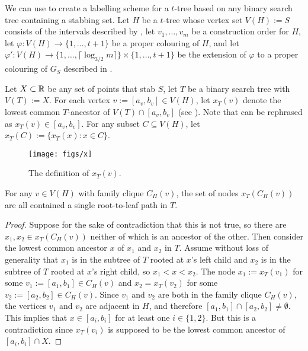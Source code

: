 \documentclass[kpfonts]{patmorin}
\begin{document}
We can use  to create a labelling scheme for a $t$-tree based on any binary search tree containing a stabbing set.  Let $H$ be a $t$-tree whose vertex set $V(H):=S$ consists of the intervals described by , let $v_1,\ldots,v_m$ be a construction order for $H$, let $\varphi:V(H)\to\{1,\ldots,t+1\}$ be a proper colouring of $H$, and let $\varphi':V(H)\to\{1,\ldots,\lceil\log_{3/2} m\rceil\}\times\{1,\ldots,t+1\}$ be the extension of $\varphi$ to a proper colouring of $G_S$ described in .

Let $X\subset\mathbb{R}$ be any set of points that stab $S$, let $T$ be a binary search tree with $V(T):=X$.
For each vertex $v:=[a_v,b_v]\in V(H)$, let $x_T(v)$ denote the lowest common $T$-ancestor of $V(T)\cap [a_v,b_v]$ (see ).  Note that  can be rephrased as $x_T(v)\in [a_v,b_v]$. For any subset $C\subseteq V(H)$, let $x_T(C):=\{x_T(x):x\in C\}$.  

\begin{figure}
  \begin{center}
    \texttt{[image: figs/x]}
  \end{center}
  \caption{The definition of $x_T(v)$.}
\end{figure}

\begin{lem}
  For any $v\in V(H)$ with family clique $C_H(v)$, the set of nodes $x_T(C_H(v))$ are all contained a single root-to-leaf path in $T$.
\end{lem}

\begin{proof}
  Suppose for the sake of contradiction that this is not true, so there are $x_1,x_2\in x_T(C_H(v))$ neither of which is an ancestor of the other.  Then consider the lowest common ancestor $x$ of $x_1$ and $x_2$ in $T$.  Assume without loss of generality that $x_1$ is in the subtree of $T$ rooted at $x$'s left child and $x_2$ is in the subtree of $T$ rooted at $x$'s right child, so $x_1<x<x_2$. The node $x_1:=x_T(v_1)$ for some $v_1:=[a_1,b_1]\in C_H(v)$ and $x_2=x_T(v_2)$ for some $v_2:=[a_2,b_2]\in C_H(v)$.  Since $v_1$ and $v_2$ are both in the family clique $C_H(v)$, the vertices $v_1$ and $v_2$ are adjacent in $H$, and therefore $[a_1,b_1]\cap[a_2,b_2]\neq\emptyset$.  This implies that $x\in [a_i,b_i]$ for at least one $i\in\{1,2\}$.  But this is a contradiction since $x_T(v_i)$ is supposed to be the lowest common ancestor of $[a_i,b_i]\cap X$.
\end{proof}
\end{document}
